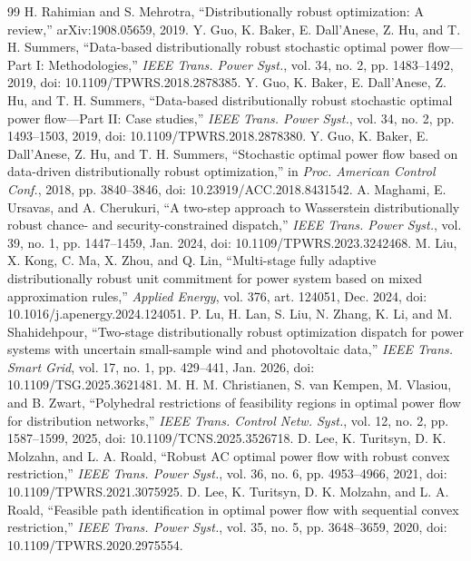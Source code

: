 \begin{thebibliography}{99}
 H. Rahimian and S. Mehrotra, ``Distributionally robust optimization: A review,'' arXiv:1908.05659, 2019.
 Y. Guo, K. Baker, E. Dall'Anese, Z. Hu, and T. H. Summers, ``Data-based distributionally robust stochastic optimal power flow---Part I: Methodologies,'' \emph{IEEE Trans. Power Syst.}, vol. 34, no. 2, pp. 1483--1492, 2019, doi: 10.1109/TPWRS.2018.2878385.
 Y. Guo, K. Baker, E. Dall'Anese, Z. Hu, and T. H. Summers, ``Data-based distributionally robust stochastic optimal power flow---Part II: Case studies,'' \emph{IEEE Trans. Power Syst.}, vol. 34, no. 2, pp. 1493--1503, 2019, doi: 10.1109/TPWRS.2018.2878380.
 Y. Guo, K. Baker, E. Dall'Anese, Z. Hu, and T. H. Summers, ``Stochastic optimal power flow based on data-driven distributionally robust optimization,'' in \emph{Proc. American Control Conf.}, 2018, pp. 3840--3846, doi: 10.23919/ACC.2018.8431542.
 A. Maghami, E. Ursavas, and A. Cherukuri, ``A two-step approach to Wasserstein distributionally robust chance- and security-constrained dispatch,'' \emph{IEEE Trans. Power Syst.}, vol. 39, no. 1, pp. 1447--1459, Jan. 2024, doi: 10.1109/TPWRS.2023.3242468.
 M. Liu, X. Kong, C. Ma, X. Zhou, and Q. Lin, ``Multi-stage fully adaptive distributionally robust unit commitment for power system based on mixed approximation rules,'' \emph{Applied Energy}, vol. 376, art. 124051, Dec. 2024, doi: 10.1016/j.apenergy.2024.124051.
 P. Lu, H. Lan, S. Liu, N. Zhang, K. Li, and M. Shahidehpour, ``Two-stage distributionally robust optimization dispatch for power systems with uncertain small-sample wind and photovoltaic data,'' \emph{IEEE Trans. Smart Grid}, vol. 17, no. 1, pp. 429--441, Jan. 2026, doi: 10.1109/TSG.2025.3621481.
 M. H. M. Christianen, S. van Kempen, M. Vlasiou, and B. Zwart, ``Polyhedral restrictions of feasibility regions in optimal power flow for distribution networks,'' \emph{IEEE Trans. Control Netw. Syst.}, vol. 12, no. 2, pp. 1587--1599, 2025, doi: 10.1109/TCNS.2025.3526718.
 D. Lee, K. Turitsyn, D. K. Molzahn, and L. A. Roald, ``Robust AC optimal power flow with robust convex restriction,'' \emph{IEEE Trans. Power Syst.}, vol. 36, no. 6, pp. 4953--4966, 2021, doi: 10.1109/TPWRS.2021.3075925.
 D. Lee, K. Turitsyn, D. K. Molzahn, and L. A. Roald, ``Feasible path identification in optimal power flow with sequential convex restriction,'' \emph{IEEE Trans. Power Syst.}, vol. 35, no. 5, pp. 3648--3659, 2020, doi: 10.1109/TPWRS.2020.2975554.

\end{thebibliography}
